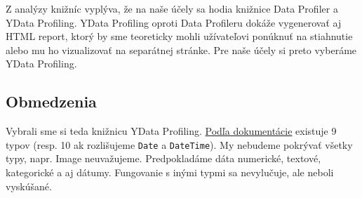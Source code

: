 Z analýzy knižníc vyplýva, že na naše účely sa hodia knižnice Data Profiler a YData Profiling. YData Profiling oproti Data Profileru dokáže vygenerovať aj HTML report, ktorý by sme teoreticky mohli užívateľovi ponúknuť na stiahnutie alebo mu ho vizualizovať na separátnej stránke. Pre naše účely si preto vyberáme YData Profiling.

\subsection{Obmedzenia}

Vybrali sme si teda knižnicu YData Profiling. \href{https://docs.profiling.ydata.ai/latest/getting-started/concepts/#data-types}{Podľa dokumentácie} existuje 9 typov (resp. 10 ak rozlišujeme \verb|Date| a \verb|DateTime|). My nebudeme pokrývať všetky typy, napr. Image neuvažujeme. Predpokladáme dáta numerické, textové, kategorické a aj dátumy. Fungovanie s inými typmi sa nevylučuje, ale neboli vyskúšané.
